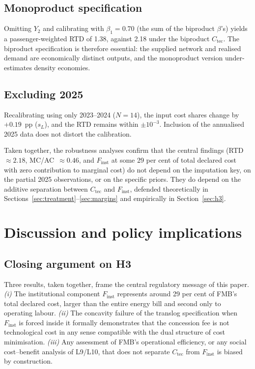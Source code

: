 \documentclass[11pt,a4paper]{article}
\begin{document}
\subsection{Monoproduct specification}
Omitting $Y_2$ and calibrating with $\beta_1 = 0.70$ (the sum of the
biproduct $\beta$'s) yields a passenger-weighted RTD of 1.38, against
2.18 under the biproduct $C_{\text{tec}}$. The biproduct specification
is therefore essential: the supplied network and realised demand are
economically distinct outputs, and the monoproduct version
under-estimates density economies.

\subsection{Excluding 2025}
Recalibrating using only 2023--2024 ($N=14$), the input cost shares
change by $+0.19$~pp ($s_L$), and the RTD remains within $\pm 10^{-3}$.
Inclusion of the annualised 2025 data does not distort the calibration.

\medskip
Taken together, the robustness analyses confirm that the central findings
(RTD~$\approx 2.18$, MC/AC~$\approx 0.46$, and $F_{\text{inst}}$ at some 29
per cent of total declared cost with zero contribution to marginal cost)
do not depend on the imputation key, on the partial 2025 observations, or
on the specific priors. They do depend on the additive separation between
$C_{\text{tec}}$ and $F_{\text{inst}}$, defended theoretically in
Sections~\ref{sec:treatment}--\ref{sec:margins} and empirically in
Section~\ref{sec:h3}.

\section{Discussion and policy implications}
\label{sec:politica}

\subsection{Closing argument on H3}
Three results, taken together, frame the central regulatory message of
this paper. \emph{(i)} The institutional component $F_{\text{inst}}$
represents around 29 per cent of FMB's total declared cost, larger than
the entire energy bill and second only to operating labour. \emph{(ii)}
The concavity failure of the translog specification when $F_{\text{inst}}$
is forced inside it formally demonstrates that the concession fee is not
technological cost in any sense compatible with the dual structure of
cost minimisation. \emph{(iii)} Any assessment of FMB's operational
efficiency, or any social cost--benefit analysis of L9/L10, that does
not separate $C_{\text{tec}}$ from $F_{\text{inst}}$ is biased by
construction.
\end{document}
